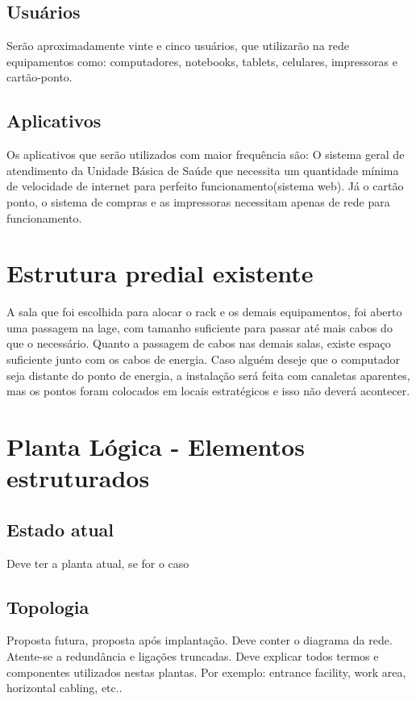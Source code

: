 \documentclass[	DIV=calc,%
							paper=a4,%
							fontsize=12pt,%
							onecolumn]{scrartcl}	 					%
\begin{document}
\subsection{Usuários}
Serão aproximadamente vinte e cinco usuários, que utilizarão na rede equipamentos como: computadores, notebooks, tablets, celulares, impressoras e cartão-ponto.

\subsection{Aplicativos}
Os aplicativos que serão utilizados com maior frequência são: O sistema geral de atendimento da Unidade Básica de Saúde que necessita um quantidade mínima de velocidade de internet para perfeito funcionamento(sistema web). Já o cartão ponto, o sistema de compras e as impressoras necessitam apenas de rede para funcionamento.

\section{Estrutura predial existente}
A sala que foi escolhida para alocar o rack e os demais equipamentos, foi aberto uma passagem na lage, com tamanho suficiente para passar até mais cabos do que o necessário. Quanto a passagem de cabos nas demais salas, existe espaço suficiente junto com os cabos de energia. Caso alguém deseje que o computador seja distante do ponto de energia, a instalação será feita com canaletas aparentes, mas os pontos foram colocados em locais estratégicos e isso não deverá acontecer.

\section{Planta Lógica - Elementos estruturados}

\subsection{Estado atual}
Deve ter a planta atual, se for o caso

\subsection{Topologia}
Proposta futura, proposta após implantação.
Deve conter o diagrama da rede. Atente-se a redundância  e ligações truncadas.
Deve explicar todos termos e componentes utilizados nestas plantas. Por exemplo: entrance facility, work area, horizontal cabling, etc..
\end{document}
